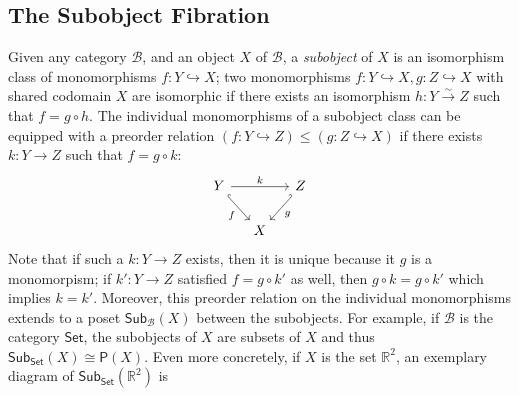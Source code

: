 \documentclass[12pt]{article}
\theoremstyle{definition}
\theoremstyle{remark}
\newcommand{\set}{\mathsf{Set}} %
\newcommand{\sub}{\mathsf{Sub}} %
\newcommand{\pow}{\mathsf{P}} %
\newcommand{\catB}{\mathcal{B}}
\begin{document}
\subsection{The Subobject Fibration}

Given any category $\catB$, and an object $X$ of $\catB$, a \textit{subobject} of $X$ is an isomorphism class of monomorphisms $f : Y \hookrightarrow X$; two monomorphisms $f : Y \hookrightarrow X, g : Z \hookrightarrow
X$ with shared codomain $X$ are isomorphic if there exists an isomorphism $h : Y \xrightarrow{\sim} Z$ such that $f = g \circ h$. The individual monomorphisms of a subobject class can be equipped with a preorder relation $( f : Y \hookrightarrow Z ) \leq ( g : Z \hookrightarrow X )$ if there exists $k : Y \rightarrow Z$ such that $f = g \circ k$:
\begin{equation}
    \begin{tikzcd}[column sep=small]
        Y \ar[rd, hook, "f"'] \ar[rr, "k"] &   & Z \ar[ld, hook', "g"]\\
          & X & 
    \end{tikzcd}
\end{equation}
Note that if such a $k : Y \to Z$ exists, then it is unique because it $g$ is a monomorpism; if $k' : Y \rightarrow Z$ satisfied $f = g \circ k'$ as well, then $g \circ k = g \circ k'$ which implies $k = k'$. Moreover, this preorder relation on the individual monomorphisms extends to a poset $\sub_{\catB}(X)$ between the subobjects. For example, if $\catB$ is the category $\set$, the subobjects of $X$ are subsets of $X$ and thus $\sub_{\set}(X) \cong \pow(X)$. Even more concretely, if $X$ is the set $\mathbb{R}^2$, an exemplary diagram of $\sub_{\set}(\mathbb{R}^2)$ is
\end{document}

